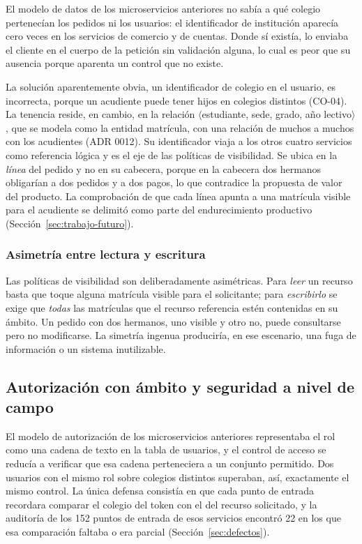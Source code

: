 El modelo de datos de los microservicios anteriores no sabía a qué colegio pertenecían los
pedidos ni los usuarios: el identificador de institución aparecía cero veces en los
servicios de comercio y de cuentas. Donde sí existía, lo enviaba el cliente en el cuerpo de
la petición sin validación alguna, lo cual es peor que su ausencia porque aparenta un
control que no existe.

La solución aparentemente obvia, un identificador de colegio en el usuario, es incorrecta,
porque un acudiente puede tener hijos en colegios distintos (CO-04). La tenencia reside, en
cambio, en la relación $\langle$estudiante, sede, grado, año lectivo$\rangle$, que se modela
como la entidad matrícula, con una relación de muchos a muchos con los acudientes
(ADR 0012). Su identificador viaja a los otros cuatro servicios como referencia lógica y es
el eje de las políticas de visibilidad. Se ubica en la \emph{línea} del pedido y no en su
cabecera, porque en la cabecera dos hermanos obligarían a dos pedidos y a dos pagos, lo que
contradice la propuesta de valor del producto. La comprobación de que cada línea apunta a
una matrícula visible para el acudiente se delimitó como parte del endurecimiento productivo
(Sección~\ref{sec:trabajo-futuro}).

\subsubsection{Asimetría entre lectura y escritura}

Las políticas de visibilidad son deliberadamente asimétricas. Para \emph{leer} un recurso
basta que toque alguna matrícula visible para el solicitante; para \emph{escribirlo} se
exige que \emph{todas} las matrículas que el recurso referencia estén contenidas en su
ámbito. Un pedido con dos hermanos, uno visible y otro no, puede consultarse pero no
modificarse. La simetría ingenua produciría, en ese escenario, una fuga de información o un
sistema inutilizable.

\subsection{Autorización con ámbito y seguridad a nivel de campo}
\label{sec:autorizacion}

El modelo de autorización de los microservicios anteriores representaba el rol como una
cadena de texto en la tabla de usuarios, y el control de acceso se reducía a verificar que
esa cadena perteneciera a un conjunto permitido. Dos usuarios con el mismo rol sobre
colegios distintos superaban, así, exactamente el mismo control. La única defensa consistía
en que cada punto de entrada recordara comparar el colegio del token con el del recurso
solicitado, y la auditoría de los 152 puntos de entrada de esos servicios encontró 22 en los
que esa comparación faltaba o era parcial (Sección~\ref{sec:defectos}).

